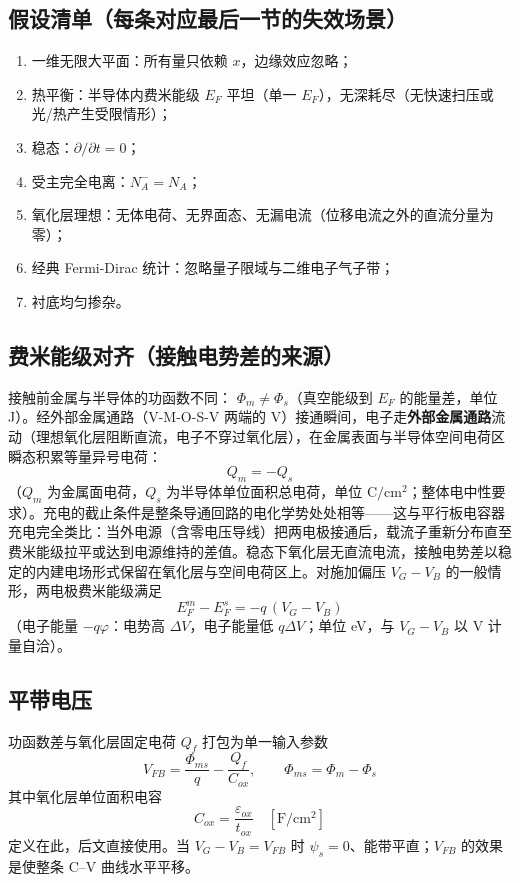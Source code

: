 \documentclass[11pt]{ctexart}
\begin{document}
\subsection{假设清单（每条对应最后一节的失效场景）}
\begin{enumerate}
  \item 一维无限大平面：所有量只依赖 $x$，边缘效应忽略；
  \item 热平衡：半导体内费米能级 $E_F$ 平坦（单一 $E_F$），无深耗尽（无快速扫压或光/热产生受限情形）；
  \item 稳态：$\partial/\partial t=0$；
  \item 受主完全电离：$N_A^-=N_A$；
  \item 氧化层理想：无体电荷、无界面态、无漏电流（位移电流之外的直流分量为零）；
  \item 经典 Fermi-Dirac 统计：忽略量子限域与二维电子气子带；
  \item 衬底均匀掺杂。
\end{enumerate}

\subsection{费米能级对齐（接触电势差的来源）}
接触前金属与半导体的功函数不同：
\(\Phi_m\ne\Phi_s\)（真空能级到 $E_F$ 的能量差，单位 J）。经外部金属通路（V-M-O-S-V 两端的 V）接通瞬间，电子走\textbf{外部金属通路}流动（理想氧化层阻断直流，电子不穿过氧化层），在金属表面与半导体空间电荷区瞬态积累等量异号电荷：
\[Q_m=-Q_s\]
（$Q_m$ 为金属面电荷，$Q_s$ 为半导体单位面积总电荷，单位 $\mathrm{C/cm^2}$；整体电中性要求）。充电的截止条件是整条导通回路的电化学势处处相等——这与平行板电容器充电完全类比：当外电源（含零电压导线）把两电极接通后，载流子重新分布直至费米能级拉平或达到电源维持的差值。稳态下氧化层无直流电流，接触电势差以稳定的内建电场形式保留在氧化层与空间电荷区上。对施加偏压 $V_G-V_B$ 的一般情形，两电极费米能级满足
\[E_F^m-E_F^s=-q\,(V_G-V_B)\]
（电子能量 $-q\varphi$：电势高 $\Delta V$，电子能量低 $q\Delta V$；单位 eV，与 $V_G-V_B$ 以 V 计量自洽）。

\subsection{平带电压}
功函数差与氧化层固定电荷 $Q_f$ 打包为单一输入参数
\[V_{FB}=\frac{\Phi_{ms}}{q}-\frac{Q_f}{C_{ox}},\qquad \Phi_{ms}=\Phi_m-\Phi_s\]
其中氧化层单位面积电容
\[C_{ox}=\frac{\varepsilon_{ox}}{t_{ox}}\quad [\mathrm{F/cm^2}]\]
定义在此，后文直接使用。当
\(V_G-V_B=V_{FB}\) 时 $\psi_s=0$、能带平直；$V_{FB}$ 的效果是使整条 C–V 曲线水平平移。
\end{document}
